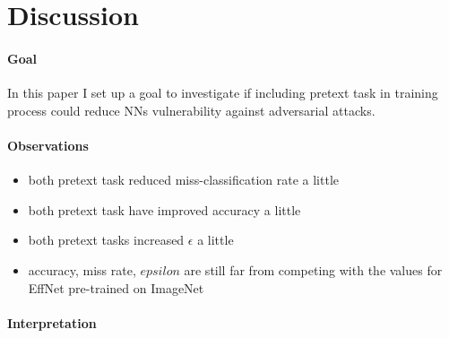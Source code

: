 \section{Discussion}

\paragraph{Goal}
In this paper I set up a goal to investigate if including pretext task in training process could reduce NNs
vulnerability against adversarial attacks.

\paragraph{Observations}
\begin{itemize}
    \item both pretext task reduced miss-classification rate a little
    \item both pretext task have improved accuracy a little
    \item both pretext tasks increased $\epsilon$ a little
    \item accuracy, miss rate, $epsilon$ are still far from competing with the values for EffNet pre-trained on ImageNet
\end{itemize}

\paragraph{Interpretation}


